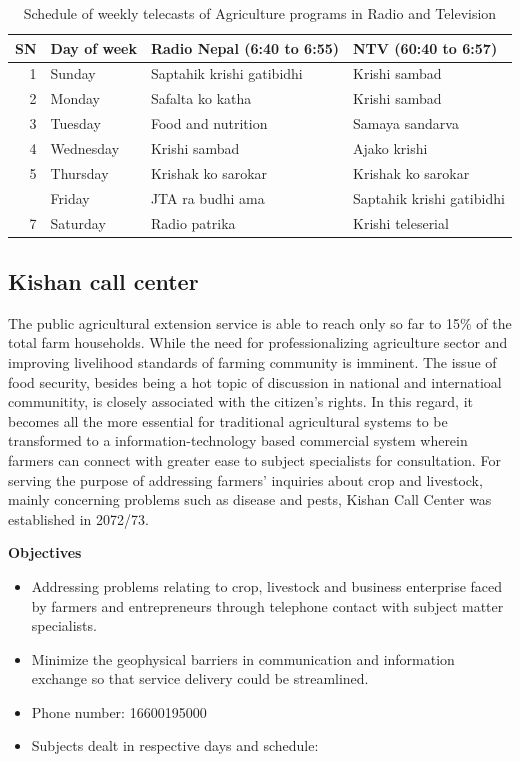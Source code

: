 \documentclass[
  openany]{book}
\begin{document}
\begin{table}[H]

\caption{\label{tab:unnamed-chunk-3}Schedule of weekly telecasts of Agriculture programs in Radio and Television}
\centering
\begin{tabular}[t]{rlll}
\toprule
SN & Day of week & Radio Nepal (6:40 to 6:55) & NTV (60:40 to 6:57)\\
\midrule
\rowcolor{gray!6}  1 & Sunday & Saptahik krishi gatibidhi & Krishi sambad\\
2 & Monday & Safalta ko katha & Krishi sambad\\
\rowcolor{gray!6}  3 & Tuesday & Food and nutrition & Samaya sandarva\\
4 & Wednesday & Krishi sambad & Ajako krishi\\
\rowcolor{gray!6}  5 & Thursday & Krishak ko sarokar & Krishak ko sarokar\\
\addlinespace
6 & Friday & JTA ra budhi ama & Saptahik krishi gatibidhi\\
\rowcolor{gray!6}  7 & Saturday & Radio patrika & Krishi teleserial\\
\bottomrule
\end{tabular}
\end{table}

\hypertarget{kishan-call-center}{%
\subsection{Kishan call center}\label{kishan-call-center}}

The public agricultural extension service is able to reach only so far to 15\% of the total farm households. While the need for professionalizing agriculture sector and improving livelihood standards of farming community is imminent. The issue of food security, besides being a hot topic of discussion in national and internatioal communitity, is closely associated with the citizen's rights. In this regard, it becomes all the more essential for traditional agricultural systems to be transformed to a information-technology based commercial system wherein farmers can connect with greater ease to subject specialists for consultation. For serving the purpose of addressing farmers' inquiries about crop and livestock, mainly concerning problems such as disease and pests, Kishan Call Center was established in 2072/73.

\textbf{Objectives}

\begin{itemize}
\item
  Addressing problems relating to crop, livestock and business enterprise faced by farmers and entrepreneurs through telephone contact with subject matter specialists.
\item
  Minimize the geophysical barriers in communication and information exchange so that service delivery could be streamlined.
\item
  Phone number: 16600195000
\item
  Subjects dealt in respective days and schedule:
\end{itemize}
\end{document}
